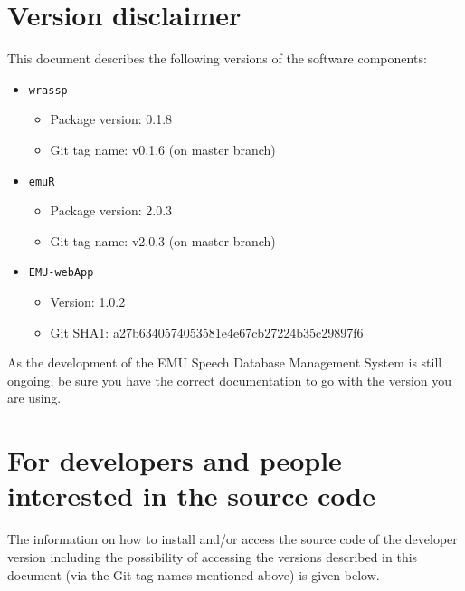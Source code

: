 \documentclass[]{book}
\providecommand{\tightlist}{%
  \setlength{\itemsep}{0pt}\setlength{\parskip}{0pt}}
\begin{document}
\hypertarget{version-disclaimer}{%
\section{Version disclaimer}\label{version-disclaimer}}

This document describes the following versions of the software components:

\begin{itemize}
\tightlist
\item
  \texttt{wrassp}

  \begin{itemize}
  \tightlist
  \item
    Package version: 0.1.8
  \item
    Git tag name: v0.1.6 (on master branch)
  \end{itemize}
\item
  \texttt{emuR}

  \begin{itemize}
  \tightlist
  \item
    Package version: 2.0.3
  \item
    Git tag name: v2.0.3 (on master branch)
  \end{itemize}
\item
  \texttt{EMU-webApp}

  \begin{itemize}
  \tightlist
  \item
    Version: 1.0.2
  \item
    Git SHA1: a27b6340574053581e4e67cb27224b35c29897f6
  \end{itemize}
\end{itemize}

As the development of the EMU Speech Database Management System is still ongoing, be sure you have the correct documentation to go with the version you are using.

\hypertarget{for-developers-and-people-interested-in-the-source-code}{%
\section{For developers and people interested in the source code}\label{for-developers-and-people-interested-in-the-source-code}}

The information on how to install and/or access the source code of the developer version including the possibility of accessing the versions described in this document (via the Git tag names mentioned above) is given below.
\end{document}
